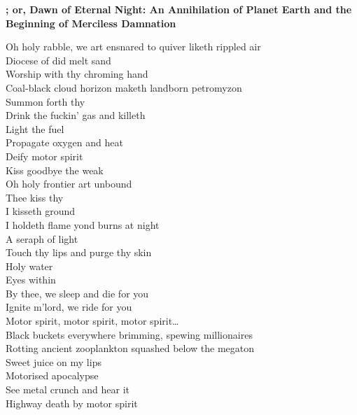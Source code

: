 \vspace*{-.5\baselineskip}
\textbf{; or, Dawn of Eternal Night: An Annihilation of Planet Earth and the Beginning of Merciless Damnation}




Oh holy rabble, we art ensnared to quiver liketh rippled air \\
Diocese of did melt sand \\
Worship with thy chroming hand \\
Coal-black cloud horizon maketh landborn petromyzon \\
Summon forth thy  \\
Drink the fuckin' gas and killeth \\

Light the fuel \\
Propagate oxygen and heat \\
Deify motor spirit \\
Kiss goodbye the weak \\

Oh holy frontier art unbound \\
Thee kiss thy  \\
I kisseth ground \\
I holdeth flame yond burns at night \\
A seraph of  light \\
Touch thy lips and purge thy skin \\
Holy water \\
Eyes within \\
By thee, we sleep and die for you \\
Ignite m'lord, we ride for you \\

Motor spirit, motor spirit, motor spirit… \\

Black buckets everywhere brimming, spewing millionaires \\
Rotting ancient zooplankton squashed below the megaton \\
Sweet juice on my lips \\
Motorised apocalypse \\
See metal crunch and hear it \\
Highway death by motor spirit \\

